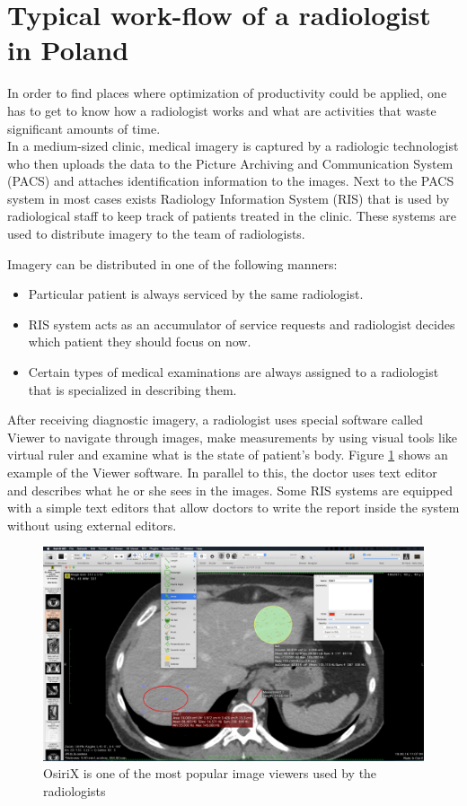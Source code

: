 \documentclass[12pt, twoside, openany]{report}
\theoremstyle{definition}
\begin{document}
\section{Typical work-flow of a radiologist in Poland}
In order to find places where optimization of productivity could be applied, one has to get to know how a radiologist works and what are activities that waste significant amounts of time. \\
In a medium-sized clinic, medical imagery is captured by a radiologic technologist who then uploads the data to the Picture Archiving and Communication System (PACS) and attaches identification information to the images. Next to the PACS system in most cases exists Radiology Information System (RIS) that is used by radiological staff to keep track of patients treated in the clinic. These systems are used to distribute imagery to the team of radiologists.

Imagery can be distributed in one of the following manners:
\begin{itemize}
    \item Particular patient is always serviced by the same radiologist.
    \item RIS system acts as an accumulator of service requests and radiologist decides which patient they should focus on now.
    \item Certain types of medical examinations are always assigned to a radiologist that is specialized in describing them.
\end{itemize}

After receiving diagnostic imagery, a radiologist uses special software called Viewer\cite{viewer} to navigate through images, make measurements by using visual tools like virtual ruler and examine what is the state of patient's body. Figure \ref{fig:osirix} shows an example of the Viewer software. In parallel to this, the doctor uses text editor and describes what he or she sees in the images. Some RIS systems are equipped with a simple text editors that allow doctors to write the report inside the system without using external editors. 

\begin{figure}
    \centering
    \includegraphics[width=0.9\linewidth]{osirix}
    \caption{OsiriX is one of the most popular image viewers used by the radiologists}
    \label{fig:osirix}
\end{figure}
\end{document}
